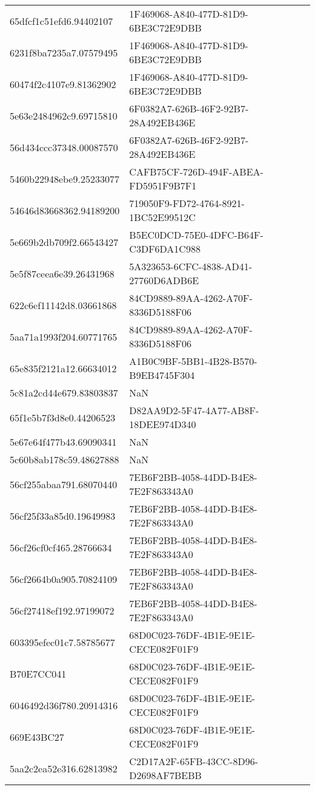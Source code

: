 \begin{tabular}{ll}
65dfcf1c51efd6.94402107 & 1F469068-A840-477D-81D9-6BE3C72E9DBB \\
6231f8ba7235a7.07579495 & 1F469068-A840-477D-81D9-6BE3C72E9DBB \\
60474f2c4107e9.81362902 & 1F469068-A840-477D-81D9-6BE3C72E9DBB \\
5e63e2484962c9.69715810 & 6F0382A7-626B-46F2-92B7-28A492EB436E \\
56d434ccc37348.00087570 & 6F0382A7-626B-46F2-92B7-28A492EB436E \\
5460b22948ebe9.25233077 & CAFB75CF-726D-494F-ABEA-FD5951F9B7F1 \\
54646d83668362.94189200 & 719050F9-FD72-4764-8921-1BC52E99512C \\
5e669b2db709f2.66543427 & B5EC0DCD-75E0-4DFC-B64F-C3DF6DA1C988 \\
5e5f87ceea6e39.26431968 & 5A323653-6CFC-4838-AD41-27760D6ADB6E \\
622c6ef11142d8.03661868 & 84CD9889-89AA-4262-A70F-8336D5188F06 \\
5aa71a1993f204.60771765 & 84CD9889-89AA-4262-A70F-8336D5188F06 \\
65e835f2121a12.66634012 & A1B0C9BF-5BB1-4B28-B570-B9EB4745F304 \\
5c81a2cd44e679.83803837 & NaN \\
65f1e5b7f3d8e0.44206523 & D82AA9D2-5F47-4A77-AB8F-18DEE974D340 \\
5e67e64f477b43.69090341 & NaN \\
5c60b8ab178c59.48627888 & NaN \\
56cf255abaa791.68070440 & 7EB6F2BB-4058-44DD-B4E8-7E2F863343A0 \\
56cf25f33a85d0.19649983 & 7EB6F2BB-4058-44DD-B4E8-7E2F863343A0 \\
56cf26cf0cf465.28766634 & 7EB6F2BB-4058-44DD-B4E8-7E2F863343A0 \\
56cf2664b0a905.70824109 & 7EB6F2BB-4058-44DD-B4E8-7E2F863343A0 \\
56cf27418ef192.97199072 & 7EB6F2BB-4058-44DD-B4E8-7E2F863343A0 \\
603395efec01c7.58785677 & 68D0C023-76DF-4B1E-9E1E-CECE082F01F9 \\
B70E7CC041 & 68D0C023-76DF-4B1E-9E1E-CECE082F01F9 \\
6046492d36f780.20914316 & 68D0C023-76DF-4B1E-9E1E-CECE082F01F9 \\
669E43BC27 & 68D0C023-76DF-4B1E-9E1E-CECE082F01F9 \\
5aa2c2ea52e316.62813982 & C2D17A2F-65FB-43CC-8D96-D2698AF7BEBB \\

\end{tabular}
